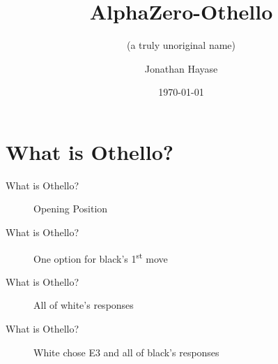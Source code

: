 \documentclass{beamer}
\title{AlphaZero-Othello}
\subtitle{(a truly unoriginal name)}
\date{\today}
\author{Jonathan Hayase}
\institute{University of Washington}
\begin{document}
\maketitle
\section{What is Othello?}
\begin{frame}{What is Othello?}
  \begin{figure}
    \centering
    \begin{othelloboard}{0.7}
      \dotmarkings
    \end{othelloboard}
    \caption{Opening Position}
  \end{figure}
\end{frame}

\begin{frame}{What is Othello?}
  \begin{figure}
    \centering
    \begin{othelloboard}{0.7}
      \dotmarkings
    \end{othelloboard}
    \caption{One option for black's 1\textsuperscript{st} move}
  \end{figure}
\end{frame}

\begin{frame}{What is Othello?}
  \begin{figure}
    \centering
    \begin{othelloboard}{0.7}
      \dotmarkings
    \end{othelloboard}
    \caption{All of white's responses}
  \end{figure}
\end{frame}

\begin{frame}{What is Othello?}
  \begin{figure}
    \centering
    \begin{othelloboard}{0.7}
      \dotmarkings
    \end{othelloboard}
    \caption{White chose E3 and all of black's responses}
  \end{figure}
\end{frame}
\end{document}
